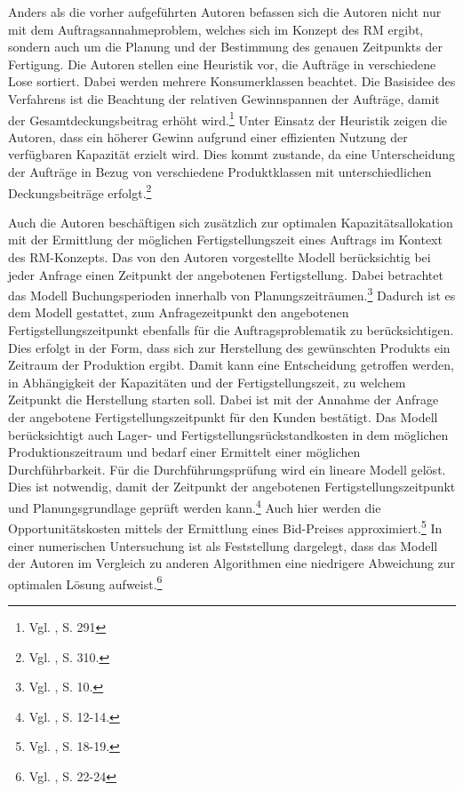 Anders als die vorher aufgeführten Autoren befassen sich die Autoren \cite{DECI:DECI074} nicht nur mit dem Auftragsannahmeproblem, welches sich im Konzept des RM ergibt, sondern auch um die Planung und der Bestimmung des genauen Zeitpunkts der Fertigung. Die Autoren stellen eine Heuristik vor, die Aufträge in verschiedene Lose sortiert. Dabei werden mehrere Konsumerklassen beachtet. Die Basisidee des Verfahrens ist die Beachtung der relativen Gewinnspannen der Aufträge, damit der Gesamtdeckungsbeitrag erhöht wird.\footnote{Vgl. \cite{DECI:DECI074}, S. 291} Unter Einsatz der Heuristik zeigen die Autoren, dass ein höherer Gewinn aufgrund einer effizienten Nutzung der verfügbaren Kapazität erzielt wird. Dies kommt zustande, da eine Unterscheidung der Aufträge in Bezug von verschiedene Produktklassen mit unterschiedlichen Deckungsbeiträge erfolgt.\footnote{Vgl. \cite{DECI:DECI074}, S. 310.}

Auch die Autoren \cite{guhlich2015revenue} beschäftigen sich zusätzlich zur optimalen Kapazitätsallokation mit der Ermittlung der möglichen Fertigstellungszeit eines Auftrags im Kontext des RM-Konzepts. Das von den Autoren vorgestellte Modell berücksichtig bei jeder Anfrage einen Zeitpunkt der angebotenen Fertigstellung. Dabei betrachtet das Modell Buchungsperioden innerhalb von Planungszeiträumen.\footnote{Vgl. \cite{guhlich2015revenue}, S. 10.} Dadurch ist es dem Modell gestattet, zum Anfragezeitpunkt den angebotenen Fertigstellungszeitpunkt ebenfalls für die Auftragsproblematik zu berücksichtigen. Dies erfolgt in der Form, dass sich zur Herstellung des gewünschten Produkts ein Zeitraum der Produktion ergibt. Damit kann eine Entscheidung getroffen werden, in Abhängigkeit der Kapazitäten und der Fertigstellungszeit, zu welchem Zeitpunkt die Herstellung starten soll. Dabei ist mit der Annahme der Anfrage der angebotene Fertigstellungszeitpunkt für den Kunden bestätigt. Das Modell berücksichtigt auch Lager- und Fertigstellungsrückstandkosten in dem möglichen Produktionszeitraum und bedarf einer Ermittelt einer möglichen Durchführbarkeit. Für die Durchführungsprüfung wird ein lineare Modell gelöst. Dies ist notwendig, damit der Zeitpunkt der angebotenen Fertigstellungszeitpunkt und Planungsgrundlage geprüft werden kann.\footnote{Vgl. \cite{guhlich2015revenue}, S. 12-14.} Auch hier werden die Opportunitätskosten mittels der Ermittlung eines Bid-Preises approximiert.\footnote{Vgl. \cite{guhlich2015revenue}, S. 18-19.} In einer numerischen Untersuchung ist als Feststellung dargelegt, dass das Modell der Autoren im Vergleich zu anderen Algorithmen eine niedrigere Abweichung zur optimalen Lösung aufweist.\footnote{Vgl. \cite{guhlich2015revenue}, S. 22-24}

